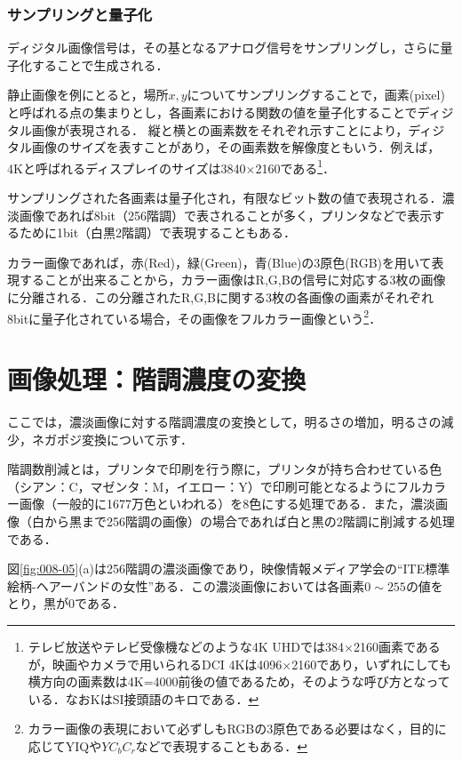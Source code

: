 \subsubsection{サンプリングと量子化}

ディジタル画像信号は，その基となるアナログ信号をサンプリングし，さらに量子化することで生成される．

静止画像を例にとると，場所$x,y$についてサンプリングすることで，画素(pixel)と呼ばれる点の集まりとし，各画素における関数の値を量子化することでディジタル画像が表現される．
%
縦と横との画素数をそれぞれ示すことにより，ディジタル画像のサイズを表すことがあり，その画素数を解像度ともいう．例えば，4Kと呼ばれるディスプレイのサイズは3840×2160である\footnote{テレビ放送やテレビ受像機などのような4K UHDでは384×2160画素であるが，映画やカメラで用いられるDCI 4Kは4096×2160であり，いずれにしても横方向の画素数は4K=4000前後の値であるため，そのような呼び方となっている．なおKはSI接頭語のキロである．}．

サンプリングされた各画素は量子化され，有限なビット数の値で表現される．濃淡画像であれば8bit（256階調）で表されることが多く，プリンタなどで表示するために1bit（白黒2階調）で表現することもある．

カラー画像であれば，赤(Red)，緑(Green)，青(Blue)の3原色(RGB)を用いて表現することが出来ることから，カラー画像はR,G,Bの信号に対応する3枚の画像に分離される．この分離されたR,G,Bに関する3枚の各画像の画素がそれぞれ8bitに量子化されている場合，その画像をフルカラー画像という\footnote{カラー画像の表現において必ずしもRGBの3原色である必要はなく，目的に応じてYIQや$YC_bC_r$などで表現することもある．}．

\section{画像処理：階調濃度の変換}

ここでは，濃淡画像に対する階調濃度の変換として，明るさの増加，明るさの減少，ネガポジ変換について示す．

階調数削減とは，プリンタで印刷を行う際に，プリンタが持ち合わせている色（シアン：C，マゼンタ：M，イエロー：Y）で印刷可能となるようにフルカラー画像（一般的に1677万色といわれる）を8色にする処理である．また，濃淡画像（白から黒まで256階調の画像）の場合であれば白と黒の2階調に削減する処理である．

図\ref{fig:008-05}(a)は256階調の濃淡画像であり，映像情報メディア学会の``ITE標準絵柄-ヘアーバンドの女性''ある．この濃淡画像においては各画素$0\sim 255$の値をとり，黒が0である．



